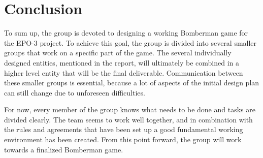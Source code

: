\section{Conclusion}
To sum up, the group is devoted to designing a working Bomberman game for the EPO-3 project. To achieve this goal, the group is divided into several smaller groups that work on a specific part of the game. The several individually designed entities, mentioned in the report, will ultimately be combined in a higher level entity that will be the final deliverable. Communication between these smaller groups is essential, because a lot of aspects of the initial design plan can still change due to unforeseen difficulties.

For now, every member of the group knows what needs to be done and tasks are divided clearly. The team seems to work well together, and in combination with the rules and agreements that have been set up a good fundamental working environment has been created. From this point forward, the group will work towards a finalized Bomberman game.